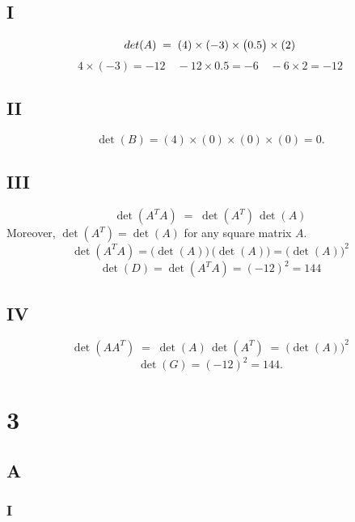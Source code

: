 \documentclass{article}
\begin{document}
\subsection*{I}

\[
	\\det(A) \;=\; (4)\times(-3)\times\bigl(0.5\bigr)\times(2)
\]
\[
	4 \times (-3) = -12
	\quad
	-12 \times 0.5 = -6
	\quad
	-6 \times 2 = -12
\]

\subsection*{II}

\[
	\det(B) = (4)\times(0)\times(0)\times(0) = 0.
\]

\subsection*{III}

\[
	\det(A^T A) \;=\; \det(A^T)\,\det(A)
\]
Moreover, $\det(A^T) = \det(A)$ for any square matrix $A$.
\[
	\det(A^T A) = \bigl(\det(A)\bigr)\,\bigl(\det(A)\bigr) = \bigl(\det(A)\bigr)^2
\]
\[
	\det(D) = \det(A^T A) = (-12)^2 = 144
\]

\subsection*{IV}

\[
	\det(A A^T) \;=\; \det(A)\,\det(A^T) \;=\; \bigl(\det(A)\bigr)^2
\]
\[
	\det(G) = (-12)^2 = 144.
\]



\section*{3}

\subsection*{A}

\subsubsection*{I}
\end{document}
